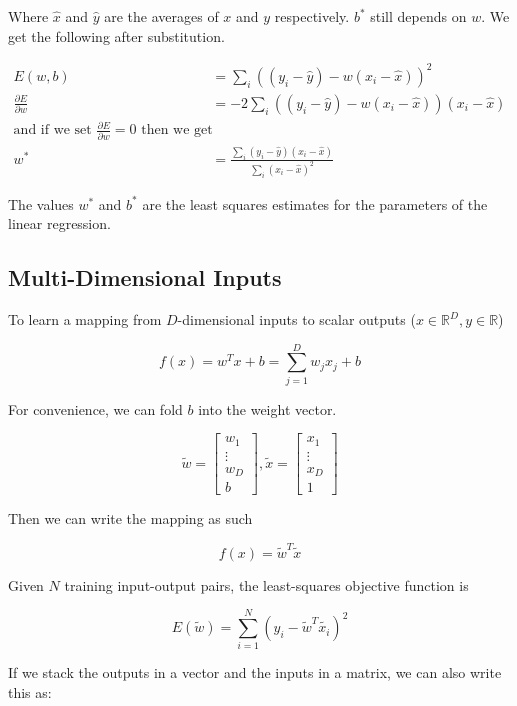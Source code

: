 \documentclass[12pt]{article}
\begin{document}
Where $\hat{x}$ and $\hat{y}$ are the averages of $x$ and $y$ respectively. $b^*$ still depends on $w$. We get the following after substitution.

\begin{align*}
    E(w,b) &= \sum_i ((y_i - \hat{y}) - w (x_i - \hat{x}))^2\\
    \frac{\partial E}{\partial w} &= -2 \sum_i ((y_i - \hat{y}) - w(x_i - \hat{x}))(x_i - \hat{x})\\
    \text{and if we set $\frac{\partial E}{\partial w} = 0$ then we get}\\
    w^* &= \frac{\sum_i (y_i - \hat{y})(x_i - \hat{x})}{\sum_i (x_i - \hat{x})^2}
\end{align*}

The values $w^*$ and $b^*$ are the least squares estimates for the parameters of the linear regression.

\subsection{Multi-Dimensional Inputs}

To learn a mapping from $D$-dimensional inputs to scalar outputs ($x\in\mathbb{R}^D, y \in\mathbb{R}$)

$$f(x) = w^T x + b = \sum^D_{j=1} w_j x_j + b$$

For convenience, we can fold $b$ into the weight vector.

$$\tilde{w} = \begin{bmatrix}
   w_{1} \\
   \vdots \\
   w_{D}\\
   b
 \end{bmatrix}, \tilde{x} = \begin{bmatrix}
   x_{1} \\
   \vdots \\
   x_{D} \\
   1
 \end{bmatrix}$$
 
Then we can write the mapping as such

$$f(x) = \tilde{w}^T \tilde{x}$$

Given $N$ training input-output pairs, the least-squares objective function is

$$E(\tilde{w}) = \sum^N_{i=1} (y_i - \tilde{w}^T \tilde{x_i})^2$$

If we stack the outputs in a vector and the inputs in a matrix, we can also write this as:
\end{document}
